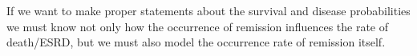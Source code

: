 If we want to make proper statements about the survival and disease
probabilities we must know not only how the occurrence of remission
influences the rate of death/ESRD, but we must also model the
occurrence rate of remission itself.

\begin{enumerate}[resume]



\end{enumerate}
